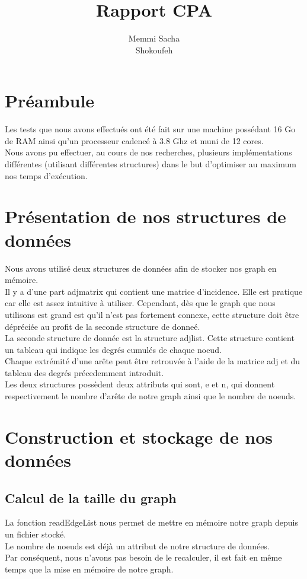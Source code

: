 \documentclass[a4paper,10pt]{report}
\title{Rapport CPA}
\author{Memmi Sacha \\ Shokoufeh}
\begin{document}
\maketitle

\clearpage
\chapter{Préambule}
Les tests que nous avons effectués ont été fait sur une machine possédant 16 Go de RAM ainsi qu'un processeur cadencé à 3.8 Ghz et muni de 12 cores.
\\
Nous avons pu effectuer, au cours de nos recherches, plusieurs implémentations différentes (utilisant différentes structures) dans le but d'optimiser au maximum nos temps d'exécution. 
\newline 

\chapter{Présentation de nos structures de données}
Nous avons utilisé deux structures de données afin de stocker nos graph en mémoire.
\\
Il y a d'une part adjmatrix qui contient une matrice d'incidence. Elle est pratique car elle est assez intuitive à utiliser. Cependant, dès que le graph que nous utilisons est grand est qu'il n'est pas fortement connexe, cette structure doit être dépréciée au profit de la seconde structure de donneé.
\\
La seconde structure de donnée est la structure adjlist. Cette structure contient un tableau qui indique les degrés cumulés de chaque noeud. 
\\
Chaque extrémité d'une arête peut être retrouvée à l'aide de la matrice adj et du tableau des degrés précedemment introduit.
\\
Les deux structures possèdent deux attributs qui sont, e et n, qui donnent respectivement le nombre d'arête de notre graph ainsi que le nombre de noeuds.
\chapter{Construction et stockage de nos données}
\section{Calcul de la taille du graph}
La fonction readEdgeList nous permet de mettre en mémoire notre graph depuis un fichier stocké. 
\\
Le nombre de noeuds est déjà un attribut de notre structure de données. 
\\Par conséquent, nous n'avons pas besoin de le recalculer, il est fait en même temps que la mise en mémoire de notre graph.
\end{document}

